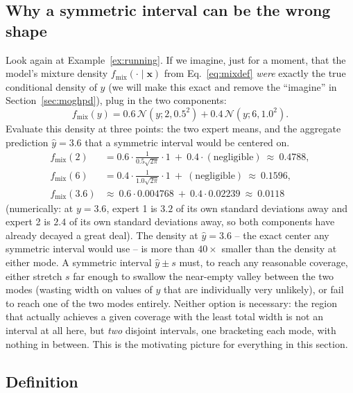 \documentclass[11pt]{article}
\begin{document}
\subsection{Why a symmetric interval can be the wrong shape}

Look again at Example~\ref{ex:running}. If we imagine, just for a moment, that the model's
mixture density $f_{\mathrm{mix}}(\cdot\mid \bm x)$ from Eq.~\eqref{eq:mixdef} \emph{were} exactly
the true conditional density of $y$ (we will make this exact and remove the ``imagine'' in
Section~\ref{sec:moghpd}), plug in the two components:
\[
f_{\mathrm{mix}}(y) = 0.6\,\mathcal N(y; 2, 0.5^2) + 0.4\,\mathcal N(y; 6, 1.0^2).
\]
Evaluate this density at three points: the two expert means, and the aggregate prediction $\hat y
= 3.6$ that a symmetric interval would be centered on.
\begin{align*}
f_{\mathrm{mix}}(2) &= 0.6\cdot \tfrac{1}{0.5\sqrt{2\pi}}\cdot 1 \ +\ 0.4\cdot(\text{negligible})
\ \approx\ 0.4788,\\
f_{\mathrm{mix}}(6) &= 0.4\cdot \tfrac{1}{1.0\sqrt{2\pi}}\cdot 1 \ +\ (\text{negligible})
\ \approx\ 0.1596,\\
f_{\mathrm{mix}}(3.6) &\approx\ 0.6\cdot0.004768 \ +\ 0.4\cdot0.02239 \ \approx\ 0.0118
\end{align*}
(numerically: at $y=3.6$, expert 1 is $3.2$ of its own standard deviations away and expert 2 is
$2.4$ of its own standard deviations away, so both components have already decayed a great deal).
The density at $\hat y=3.6$ -- the exact center any symmetric interval would use -- is more than
$40\times$ smaller than the density at either mode. A symmetric interval $\hat y \pm s$ must, to
reach any reasonable coverage, either stretch $s$ far enough to swallow the near-empty valley
between the two modes (wasting width on values of $y$ that are individually very unlikely), or
fail to reach one of the two modes entirely. Neither option is necessary: the region that actually
achieves a given coverage with the least total width is not an interval at all here, but
\emph{two} disjoint intervals, one bracketing each mode, with nothing in between. This is the
motivating picture for everything in this section.

\subsection{Definition}
\end{document}
